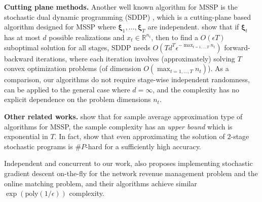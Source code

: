 \documentclass[11pt,fullpage,letterpaper]{article}
\newcommand{\R}{\mathbb{R}}
\newcommand{\bx}{\boldsymbol{\xi}}
\begin{document}
\textbf{Cutting plane methods.} Another well known algorithm for MSSP is the stochastic dual dynamic programming (SDDP) \cite{python-package, ju2023dualdynamicprogrammingstochastic,lan_complexity_2022,pereira_multi-stage_1991}, which is a cutting-plane based algorithm designed for MSSP where $\bx_1,\ldots,\bx_T$ are independent. \cite{lan_complexity_2022,lan_correction_2022} show that if $\bx_t$ has at most $d$ possible realizations and $x_t\in \R^{n_t}$, then to find a $O(\epsilon T)$ suboptimal solution for all stages, SDDP needs $O(Td^T\epsilon^{-\max_{t=1,\ldots,T} n_t})$ forward-backward iterations, where each iteration involves (approximately) solving $T$ convex optimization problems (of dimension $O(\max_{t=1,\ldots,T} n_t)$). As a comparison, our algorithms do not require stage-wise independent randomness, can be applied to the general case where $d=\infty$, and the complexity has no explicit dependence on the problem dimensions $n_t$.  

\textbf{Other related works.} \cite{shapiro_inference_2003,SHAPIRO20061complexity,Shapiro2005} show that for sample average approximation type of algorithms for MSSP, the sample complexity has an \textit{upper bound} which is exponential in $T$. In fact, \cite{dyer_computational_2006,hanasusanto_comment_2016} show that even approximating the solution of $2$-stage stochastic programs is $\#P$-hard for a sufficiently high accuracy. 

Independent and concurrent to our work, \cite{cetin2025onlinestochasticpackinggeneral} also proposes implementing stochastic gradient descent on-the-fly for the network revenue management problem and the online matching problem, and their algorithms achieve similar $\exp(\text{poly}(1/\epsilon))$ complexity.











\end{document}
